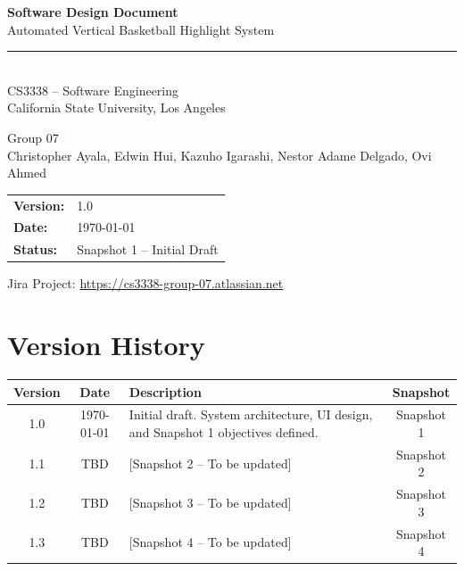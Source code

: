 \documentclass[12pt]{article}
\begin{document}
\begin{titlepage}
    \centering
    \vspace*{2cm}

    {\LARGE\bfseries Software Design Document\\[0.5em]}
    {\Large Automated Vertical Basketball Highlight System\\[2em]}

    \rule{\linewidth}{0.5pt}\\[1em]

    {\large CS3338 -- Software Engineering\\
    California State University, Los Angeles\\[1em]}

    {\large Group 07\\[2em]}
    {\normalsize Christopher Ayala, Edwin Hui, Kazuho Igarashi, Nestor Adame Delgado, Ovi Ahmed\\[2em] }

    \begin{tabular}{ll}
        \textbf{Version:}  & 1.0                   \\
        \textbf{Date:}     & \today                \\
        \textbf{Status:}   & Snapshot 1 -- Initial Draft \\
    \end{tabular}

    \vfill
    {\small Jira Project: \href{https://cs3338-group-07.atlassian.net}{https://cs3338-group-07.atlassian.net}}
\end{titlepage}

\tableofcontents
\newpage

\section*{Version History}

\begin{tabularx}{\textwidth}{|c|c|X|c|}
    \hline
    \textbf{Version} & \textbf{Date} & \textbf{Description} & \textbf{Snapshot} \\
    \hline
    1.0 & \today & Initial draft. System architecture, UI design, and Snapshot 1 objectives defined. & Snapshot 1 \\
    \hline
    1.1 & TBD & [Snapshot 2 -- To be updated] & Snapshot 2 \\
    \hline
    1.2 & TBD & [Snapshot 3 -- To be updated] & Snapshot 3 \\
    \hline
    1.3 & TBD & [Snapshot 4 -- To be updated] & Snapshot 4 \\
    \hline
\end{tabularx}
\end{document}
